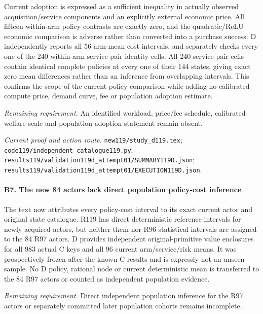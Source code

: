 Current adoption is expressed as a sufficient inequality in actually observed acquisition/\allowbreak{}service components and an explicitly external economic price. All fifteen within-arm policy contrasts are exactly zero, and the quadratic/\allowbreak{}ReLU economic comparison is adverse rather than converted into a purchase success. D independently reports all 56 arm-mean cost intervals, and separately checks every one of the 240 within-arm service-pair identity cells. All 240 service-pair cells contain identical complete policies at every one of their 144 states, giving exact zero mean differences rather than an inference from overlapping intervals. This confirms the scope of the current policy comparison while adding no calibrated compute price, demand curve, fee or population adoption estimate.

\par\emph{Remaining requirement.} An identified workload, price/\allowbreak{}fee schedule, calibrated welfare scale and population adoption statement remain absent.

\par\emph{Current proof and action route.} \nolinkurl{new119/study_d119.tex}; \nolinkurl{code119/independent_catalogue119.py}; \nolinkurl{results119/validation119d_attempt01/SUMMARY119D.json}; \nolinkurl{results119/validation119d_attempt01/EXECUTION119D.json}.

\paragraph{B7. The new 84 actors lack direct population policy-cost inference}

The text now attributes every policy-cost interval to its exact current actor and original state catalogue. R119 has direct deterministic reference intervals for newly acquired actors, but neither them nor R96 statistical intervals are assigned to the 84 R97 actors. D provides independent original-primitive value enclosures for all 983 actual C keys and all 96 current arm/\allowbreak{}service/\allowbreak{}risk means. It was prospectively frozen after the known C results and is expressly not an unseen sample. No D policy, rational node or current deterministic mean is transferred to the 84 R97 actors or counted as independent population evidence.

\par\emph{Remaining requirement.} Direct independent population inference for the R97 actors or separately committed later population cohorts remains incomplete.

